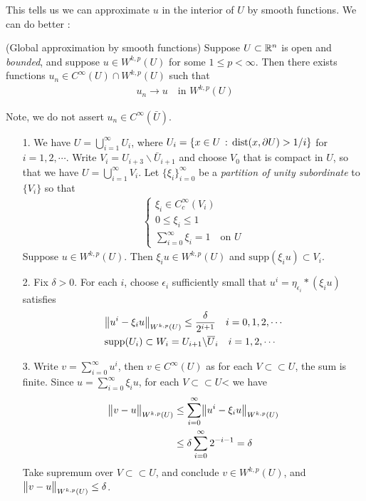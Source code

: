 \documentclass[12pt,a4paper]{report}
\newenvironment{proof}
{\begin{changemargin}{1cm}{0.5cm} 
	}%
	{\end{changemargin}
}
\begin{document}
This tells us we can approximate $u$ in the interior of $U$ by smooth functions. We can do better :
\s

\thm (Global approximation by smooth functions) Suppose $U\subset \mathbb{R}^n$ is open and \emph{bounded}, and suppose $u\in W^{k,p}(U)$ for some $1\leq p<\infty$. Then there exists functions $u_n \in C^{\infty}(U) \cap W^{k,p}(U)$ such that
\begin{align*}
u_n \rightarrow u \quad \text{in } W^{k,p}(U)
\end{align*}

Note, we do not assert $u_n \in C^{\infty}(\bar{U})$.
\begin{proof}
\pf \begin{itemize}
\item[1.] We have $U = \bigcup_{i=1}^{\infty} U_i$, where $U_i = \{x\in U \, : \, \text{dist}(x,\partial U) > 1/i \}$ for $i=1,2,\cdots$. Write $V_i = U_{i+3} \backslash \bar{U}_{i+1}$ and choose $V_0$ that is compact in $U$, so that we have $U = \bigcup_{i=1}^{\infty} V_i$. Let $\{\xi_i\}_{i=0}^{\infty}$ be a \emph{partition of unity subordinate} to $\{V_i \}$ so that
\begin{align*}
\begin{cases}
\xi_i \in C_c^{\infty}(V_i) \\
0\leq \xi_i \leq 1 \\
\sum_{i=0}^{\infty} \xi_i = 1 \quad \text{on } U
\end{cases}
\end{align*}
Suppose $u\in W^{k,p}(U)$. Then $\xi_i u \in W^{k,p}(U)$ and $\text{supp}(\xi_i u) \subset V_i$.
\item[2.] Fix $\delta >0$. For each $i$, choose $\epsilon_i$ sufficiently small that $u^i = \eta_{\epsilon_i} * (\xi_i u)$ satisfies
\begin{align*}
&\bigl\lVert u^i - \xi_i u\bigr\rVert_{W^{k,p}(U)} \leq \frac{\delta}{2^{i+1}} \quad i=0,1,2,\cdots \\
& \text{supp}(U_i) \subset W_i = U_{i+1} \backslash \overline{U}_i \quad i=1,2,\cdots
\end{align*}
\item[3.] Write $v = \sum_{i=0}^{\infty} u^i$, then $v \in C^{\infty}(U)$ as for each $V \subset\subset U$, the sum is finite. Since $u = \sum_{i=0}^{\infty} \xi_i u$, for each $V\subset\subset U$< we have
\begin{align*}
\bigl\lVert v-u\bigr\rVert_{W^{k,p}(U)} &\leq \sum_{i=0}^{\infty} \bigl\lVert u^i- \xi_i u\bigr\rVert_{W^{k,p}(U)} \\
& \leq \delta \sum_{i=0}^{\infty} 2^{-i-1} = \delta
\end{align*}
Take supremum over $V\subset\subset U$, and conclude $v \in W^{k,p}(U)$, and $\bigl\lVert v-u\bigr\rVert_{W^{k,p}(U)} \leq \delta$.
\end{itemize}

\eop
\end{proof}
\s
\end{document}
